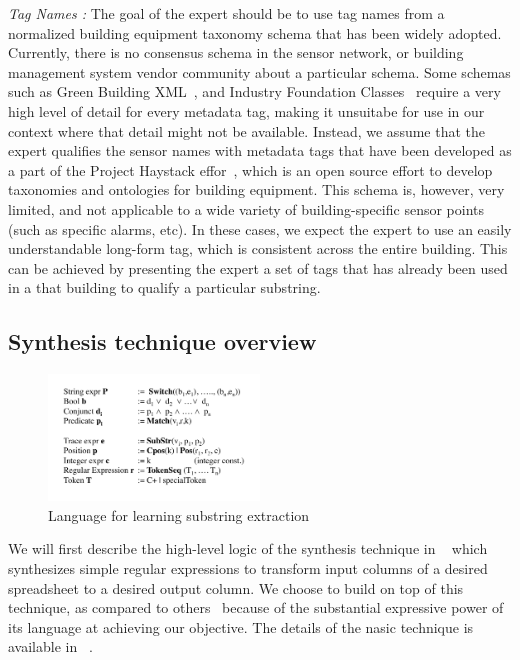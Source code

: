 {\it Tag Names :} The goal of the expert should be to use tag names from a normalized building equipment taxonomy schema that has been widely adopted. Currently, there is no consensus schema in the sensor network, or building management system vendor community about a particular schema. Some schemas such as Green Building XML~\cite{GBXML}, and Industry Foundation Classes~\cite{IFC} require a very high level of detail for every metadata tag, making it unsuitabe for use in our context where that detail might not be available. Instead, we assume that the expert qualifies the sensor names with metadata tags that have been developed as a part of the Project Haystack effor~\cite{haystack}, which is an open source effort to develop taxonomies and ontologies for building equipment. This schema is, however, very limited, and not applicable to a wide variety of building-specific sensor points (such as specific alarms, etc). In these cases, we expect the expert to use an easily understandable long-form tag, which is consistent across the entire building. This can be achieved by presenting the expert a set of tags that has already been used in a that building to qualify a particular substring. 


\subsection{Synthesis technique overview}
\label{sec:synth}

\begin{figure}[h!]
  
  \centering
    \includegraphics[width=0.5\textwidth]{figs/stringLanguage.pdf}
\caption{Language for learning substring extraction}
\label{fig:language}
\end{figure}


We will first describe the high-level logic of the synthesis technique in ~\cite{Gulwani:2011} which synthesizes simple regular expressions to transform input columns of a desired spreadsheet to a desired output column. We choose to build on top of this technique, as compared to others~\cite{} because of the substantial expressive power of its language at achieving our objective. The details of the nasic technique is available in ~\cite{Gulwani:2011}. 

